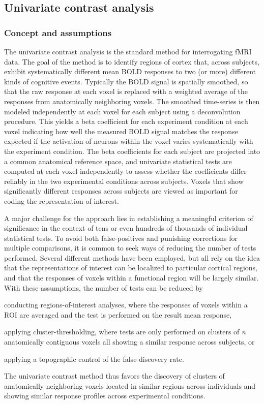 \subsection{Univariate contrast analysis}
\subsubsection{Concept and assumptions} The univariate contrast analysis is the standard method for interrogating fMRI data. The goal of the method is to identify regions of cortex that, across subjects, exhibit systematically different mean BOLD responses to two (or more) different kinds of cognitive events. Typically the BOLD signal is spatially smoothed, so that the raw response at each voxel is replaced with a weighted average of the responses from anatomically neighboring voxels. The smoothed time-series is then modeled independently at each voxel for each subject using a deconvolution procedure. This yields a beta coefficient for each experiment condition at each voxel indicating how well the measured BOLD signal matches the response expected if the activation of neurons within the voxel varies systematically with the experiment condition. The beta coefficients for each subject are projected into a common anatomical reference space, and univariate statistical tests are computed at each voxel independently to assess whether the coefficients differ reliably in the two experimental conditions across subjects. Voxels that show significantly different responses across subjects are viewed as important for coding the representation of interest. 

A major challenge for the approach lies in establishing a meaningful criterion of significance in the context of tens or even hundreds of thousands of individual statistical tests. To avoid both false-positives and punishing corrections for multiple comparisons, it is common to seek ways of reducing the number of tests performed. Several different methods have been employed, but all rely on the idea that the representations of interest can be localized to particular cortical regions, and that the responses of voxels within a functional region will be largely similar. With these assumptions, the number of tests can be reduced by 
\begin{seriate}
  \item conducting regions-of-interest analyses, where the responses of voxels within a ROI are averaged and the test is performed on the result mean response,
  \item applying cluster-thresholding, where tests are only performed on clusters of {\em n} anatomically contiguous voxels all showing a similar response across subjects, or
  \item applying a topographic control of the false-discovery rate. 
\end{seriate} 
The univariate contrast method thus favors the discovery of clusters of anatomically neighboring voxels located in similar regions across individuals and showing similar response profiles across experimental conditions. 

